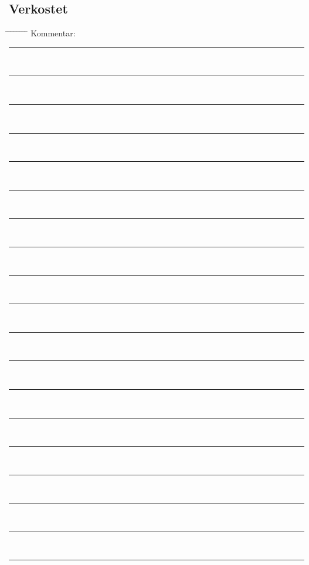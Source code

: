 \documentclass[12pt,oneside,a4paper]{scrartcl}
\begin{document}
{\subsection*{Verkostet}
\begin{tabbing}
	\hspace{1cm} \= \hspace{1cm} \= \hspace{1cm} \= \hspace{1cm} \= \hspace{1cm} \= \hspace{1cm} \= \hspace{1cm} \= \hspace{1cm} \= \kill
	\> Kommentar: \>\>\> \\
	\> \>  \rule[-0.2cm]{15.3cm}{1pt}\\
	\> \>  \rule[-0.2cm]{15.3cm}{1pt}\\
	\> \>  \rule[-0.2cm]{15.3cm}{1pt}\\		
	\> \>  \rule[-0.2cm]{15.3cm}{1pt}\\
	\> \>  \rule[-0.2cm]{15.3cm}{1pt}\\
	\> \>  \rule[-0.2cm]{15.3cm}{1pt}\\
	\> \>  \rule[-0.2cm]{15.3cm}{1pt}\\
	\> \>  \rule[-0.2cm]{15.3cm}{1pt}\\
	\> \>  \rule[-0.2cm]{15.3cm}{1pt}\\
	\> \>  \rule[-0.2cm]{15.3cm}{1pt}\\
	\> \>  \rule[-0.2cm]{15.3cm}{1pt}\\
	\> \>  \rule[-0.2cm]{15.3cm}{1pt}\\
	\> \>  \rule[-0.2cm]{15.3cm}{1pt}\\
	\> \>  \rule[-0.2cm]{15.3cm}{1pt}\\
	\> \>  \rule[-0.2cm]{15.3cm}{1pt}\\
	\> \>  \rule[-0.2cm]{15.3cm}{1pt}\\
	\> \>  \rule[-0.2cm]{15.3cm}{1pt}\\
	\> \>  \rule[-0.2cm]{15.3cm}{1pt}\\
	\> \>  \rule[-0.2cm]{15.3cm}{1pt}
\end{tabbing}}
\end{document}
